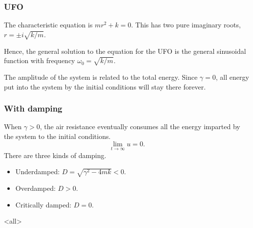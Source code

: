 \begin{frame}

\frametitle{UFO}
\label{ufo}

The characteristic equation is $ mr^2 + k = 0 $. This has two pure imaginary roots, $ r = \pm i \sqrt{k/m} $.

Hence, the general solution to the equation for the UFO is the general sinusoidal function with frequency $ \omega_0 = \sqrt{k/m} $.

The amplitude of the system is related to the total energy. Since $ \gamma = 0 $, all energy put into the system by the initial conditions will stay there forever.

\end{frame}

\begin{frame}

\frametitle{With damping}
\label{withdamping}

When $ \gamma > 0 $, the air resistance eventually consumes all the energy imparted by the system to the initial conditions.
\[
    \lim_{t \to \infty} u = 0.
\]
There are three kinds of damping.

\begin{itemize}
\item Underdamped: $ D = \sqrt{\gamma^2 - 4mk} < 0 $.

\item Overdamped: $ D > 0 $.

\item Critically damped: $ D = 0 $.

\end{itemize}

\end{frame}

\mode<all>


\mode*

